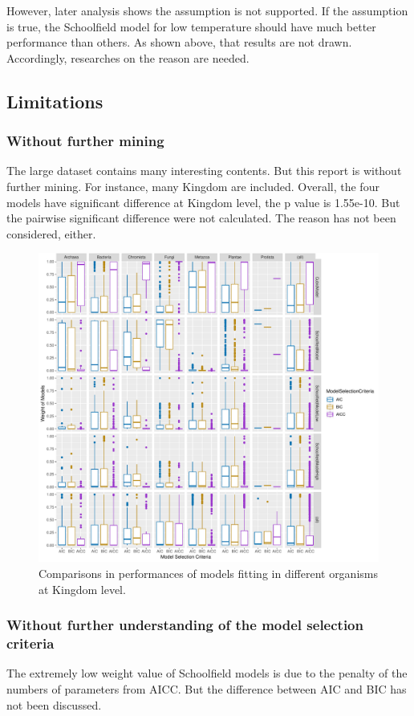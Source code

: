 \documentclass[11pt]{article}
\begin{document}
		However, later analysis shows the assumption is not supported. If the assumption is true, the Schoolfield model for low temperature should have much better performance than others. As shown above, that results are not drawn. Accordingly, researches on the reason are needed.
		\subsection{Limitations}
		\subsubsection{Without further mining}
		The large dataset contains many interesting contents. But this report is without further mining. For instance, many Kingdom are included. Overall, the four models have significant difference at Kingdom level, the p value is 1.55e-10. But the pairwise significant difference were not calculated. The reason has not been considered, either.
		
		\begin{figure}[H]
		\centering
		\includegraphics[width = \textwidth]{../Results/kindom.pdf}
		\caption{Comparisons in performances of models fitting in different organisms at Kingdom level.}
	    \end{figure}
	    
		\subsubsection{Without further understanding of the model selection criteria}
		The extremely low weight value of Schoolfield models is due to the penalty of the numbers of parameters from AICC. But the difference between AIC and BIC has not been discussed.
		
\end{document}
